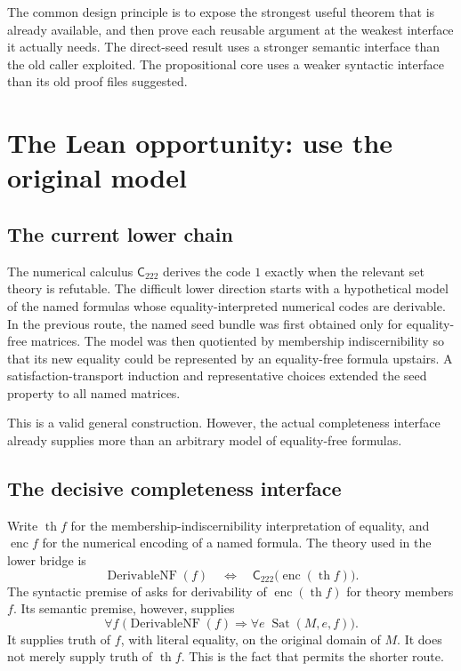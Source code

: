 \documentclass[11pt,letterpaper]{article}
\theoremstyle{definition}
\theoremstyle{remark}
\newcommand{\enc}{\operatorname{enc}}
\newcommand{\thh}{\operatorname{th}}
\newcommand{\Sat}{\operatorname{Sat}}
\newcommand{\Der}{\operatorname{DerivableNF}}
\newcommand{\Ccal}{\mathsf{C}_{222}}
\newcommand{\code}[1]{\texttt{\detokenize{#1}}}
\begin{document}
The common design principle is to expose the strongest useful theorem that is
already available, and then prove each reusable argument at the weakest interface
it actually needs. The direct-seed result uses a stronger semantic interface than
the old caller exploited. The propositional core uses a weaker syntactic interface
than its old proof files suggested.

\section{The Lean opportunity: use the original model}

\subsection{The current lower chain}

The numerical calculus \(\Ccal\) derives the code \(1\) exactly when the relevant
set theory is refutable. The difficult lower direction starts with a hypothetical
model of the named formulas whose equality-interpreted numerical codes are
derivable. In the previous route, the named seed bundle was first obtained only
for equality-free matrices. The model was then quotiented by membership
indiscernibility so that its new equality could be represented by an equality-free
formula upstairs. A satisfaction-transport induction and representative choices
extended the seed property to all named matrices.

This is a valid general construction. However, the actual completeness interface
already supplies more than an arbitrary model of equality-free formulas.

\subsection{The decisive completeness interface}

Write \(\thh f\) for the membership-indiscernibility interpretation of equality,
and \(\enc f\) for the numerical encoding of a named formula. The theory used in
the lower bridge is
\[
  \Der(f) \quad\Longleftrightarrow\quad
  \Ccal\bigl(\enc(\thh f)\bigr).
\]
The syntactic premise of \code{KEind222.c222_complete} asks for derivability of
\(\enc(\thh f)\) for theory members \(f\). Its semantic premise, however, supplies
\[
  \forall f\;\bigl(\Der(f)\Longrightarrow
       \forall e\;\Sat(M,e,f)\bigr).                 \tag{1}
\]
It supplies truth of \(f\), with literal equality, on the original domain of \(M\).
It does not merely supply truth of \(\thh f\). This is the fact that permits the
shorter route.
\end{document}
